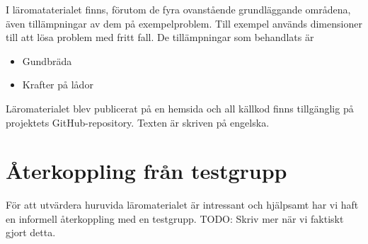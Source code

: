 \begin{binge}
I läromataterialet finns, förutom de fyra ovanstående grundläggande områdena, även tillämpningar av dem på exempelproblem. Till exempel används dimensioner till att lösa problem med fritt fall. De tillämpningar som behandlats är

\begin{itemize}
  \item Gundbräda
  \item Krafter på lådor
\end{itemize}

Läromaterialet blev publicerat på en hemsida\cite{LYAP} och all källkod finns tillgänglig på projektets GitHub-repository.\cite{LYAP_repo} Texten är skriven på engelska.

\section{Återkoppling från testgrupp}

För att utvärdera huruvida läromaterialet är intressant och hjälpsamt har vi
haft en informell återkoppling med en testgrupp. TODO: Skriv mer när vi
faktiskt gjort detta.

\end{binge}
